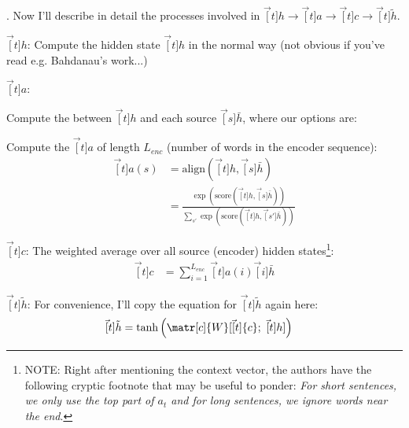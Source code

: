 \documentclass[11pt]{article}
\begin{document}
\myspace
\p {}. Now I'll describe in detail the processes involved in $\vec[t]{h} \rightarrow  \vec[t]{a} \rightarrow \vec[t]{c} \rightarrow   \vec[t]{\tilde h}$.
\begin{compactenum}
	\item $\vec[t]{h}$: Compute the hidden state $\vec[t]{h}$ in the normal way (not obvious if you've read e.g. Bahdanau's work...)
	
	\item $\vec[t]{a}$: 
	\begin{compactenum}
		\item Compute the  between $\vec[t]{h}$ and each source $\vec[s]{\bar h}$, where our options are:
		
		\item Compute the  $\vec[t]{a}$ of length $L_{enc}$ (number of words in the encoder sequence):
		\begin{align}
		\vec[t]{a}(s) &= \text{align}(\vec[t]{h}, \vec[s]{\bar h}) \\
		&= \frac{\exp(\text{score}(\vec[t]{h}, \vec[s]{\bar h}) )}{
			\sum_{s'} \exp(\text{score}(\vec[t]{h}, \vec[s']{\bar h}) )
		}
		\end{align}
	\end{compactenum}
	
	\item $\vec[t]{c}$: The weighted average over all source (encoder) hidden states\footnote{NOTE: Right after mentioning the context vector, the authors have the following cryptic footnote that may be useful to ponder: \textit{For short sentences, we only use the top part of
			$a_t$ and for long sentences, we ignore words near the end}.}:
	\begin{align}
	\vec[t]{c} &= \sum_{i = 1}^{L_{enc}} \vec[t]{a}(i) \vec[i]{\bar h}
	\end{align}
	
	\item $\vec[t]{\tilde h}$: For convenience, I'll copy the equation for $\vec[t]{\tilde h}$ again here:
	\begin{align}
	\vec[t]{\tilde h} &= \tanh\left(  \matr[c]{W} [\vec[t]{c};~ \vec[t]{h}]   \right)
	\end{align}
\end{compactenum}
\end{document}
